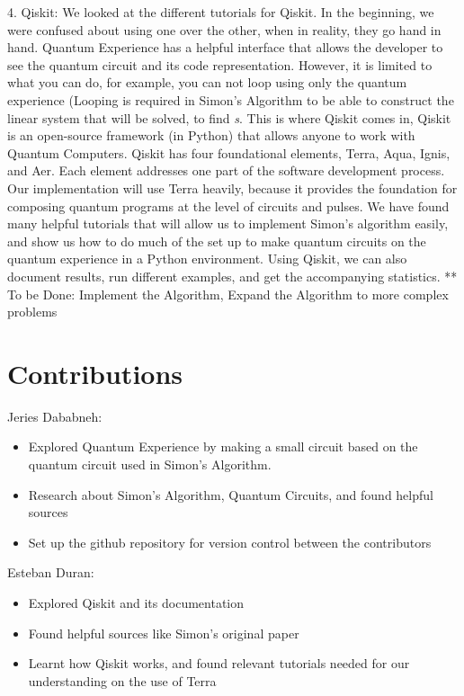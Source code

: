 \documentclass[11pt]{article}
\begin{document}
 4. Qiskit: We looked at the different tutorials for Qiskit. In the beginning, we were confused about using one over the other, when in reality, they go hand in hand. Quantum Experience has a helpful interface that allows the developer to see the quantum circuit and its code representation. However, it is limited to what you can do, for example, you can not loop using only the quantum experience (Looping is required in Simon's Algorithm to be able to construct the linear system that will be solved, to find \emph{s}. This is where Qiskit comes in, Qiskit is an open-source framework (in Python) that allows anyone to work with Quantum Computers. Qiskit has four foundational elements, Terra, Aqua, Ignis, and Aer. Each element addresses one part of the software development process. Our implementation will use Terra heavily, because it provides the foundation for composing quantum programs at the level of circuits and pulses. We have found many helpful tutorials that will allow us to implement Simon's algorithm easily, and show us how to do much of the set up to make quantum circuits on the quantum experience in a Python environment. Using Qiskit, we can also document results, run different examples, and get the accompanying statistics. \newline
 \newline 
** To be Done: Implement the Algorithm, Expand the Algorithm to more complex problems
 



\break
\section*{Contributions}
Jeries Dababneh: \begin{itemize}
\item Explored Quantum Experience by making a small circuit based on the quantum circuit used in Simon's Algorithm.
\item Research about Simon's Algorithm, Quantum Circuits, and found helpful sources
\item Set up the github repository for version control between the contributors
\end{itemize}
Esteban Duran:  \begin{itemize}
\item Explored Qiskit and its documentation
\item Found helpful sources like Simon's original paper
\item Learnt how Qiskit works, and found relevant tutorials needed for our understanding on the use of Terra
\end{itemize}
\label{sec:contributions}
\end{document}

